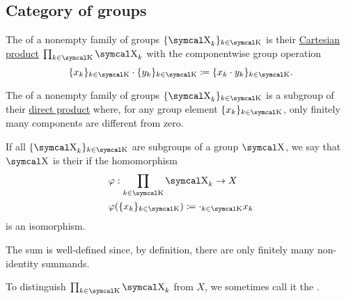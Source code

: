 \subsection{Category of groups}\label{subsec:groups}

\begin{definition}\label{def:group_direct_product}
  The  of a nonempty family of groups \( \{ \CX_k \}_{k \in \CK} \) is their \hyperref[def:cartesian_product]{Cartesian product} \( \prod_{k \in \CK} \CX_k \) with the componentwise group operation
  \begin{equation*}
    \{ x_k \}_{k \in \CK} \cdot \{ y_k \}_{k \in \CK}
    \coloneqq
    \{ x_k \cdot y_k \}_{k \in \CK}.
  \end{equation*}
\end{definition}

\begin{definition}\label{def:group_direct_sum}
  The  of a nonempty family of groups \( \{ \CX_k \}_{k \in \CK} \) is a subgroup of their \hyperref[def:group_direct_sum]{direct product} where, for any group element \( \{ x_k \}_{k \in \CK} \), only finitely many components are different from zero.

  \begin{DefEnum}
    If all \( \{ \CX_k \}_{k \in \CK} \) are subgroups of a group \( \CX \), we say that \( \CX \) is their  if the homomorphism
    \begin{align*}
       &\varphi: \prod_{k \in \CK} \CX_k \to X \\
       &\varphi(\{ x_k \}_{k \in \CK}) \coloneqq \cdot_{k \in \CK} x_k
    \end{align*}
    is an isomorphism.

    The sum is well-defined since, by definition, there are only finitely many non-identity summands.

     To distinguish \( \prod_{k \in \CK} \CX_k \) from \( X \), we sometimes call it the .
  \end{DefEnum}
\end{definition}

